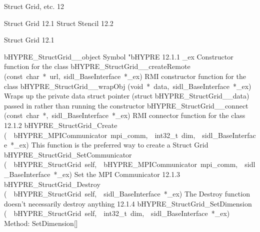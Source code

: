 \documentclass{article}
\begin{document}
\begin{cxxentry}
{}
        {Struct Grid, etc.}
        {}
        {
}
        {12}
\begin{cxxnames}
\cxxitem{}
        {Struct Grid}
        {}
        {
}
        {12.1}
\cxxitem{}
        {Struct Stencil}
        {}
        {
}
        {12.2}
\end{cxxnames}
\begin{cxxentry}
{}
        {Struct Grid}
        {}
        {
}
        {12.1}
\begin{cxxnames}
        {bHYPRE\_StructGrid\_\_object}
        {}
        {
Symbol "bHYPRE}
        {12.1.1}
        {\_ex}
        {}
        {
Constructor function for the class}
        {}
\label{cxx.12.1.9}
        {bHYPRE\_StructGrid\_\_createRemote}
        {(const\ char\ *\ url,\ sidl\_BaseInterface\ *\_ex)}
        {
RMI constructor function for the class}
        {}
\label{cxx.12.1.10}
        {bHYPRE\_StructGrid\_\_wrapObj}
        {(void\ *\ data,\ sidl\_BaseInterface\ *\_ex)}
        {
Wraps up the private data struct pointer (struct bHYPRE\_StructGrid\_\_data) passed in rather than running the constructor}
        {}
\label{cxx.12.1.11}
        {bHYPRE\_StructGrid\_\_connect}
        {(const\ char\ *,\ sidl\_BaseInterface\ *\_ex)}
        {
RMI connector function for the class}
        {12.1.2}
        {bHYPRE\_StructGrid\_Create}
        {(\ \ bHYPRE\_MPICommunicator\ mpi\_comm,\ \ int32\_t\ dim,\ \ sidl\_BaseInterface\ *\_ex)}
        {
This function is the preferred way to create a Struct Grid}
        {}
\label{cxx.12.1.12}
        {bHYPRE\_StructGrid\_SetCommunicator}
        {(\ \ bHYPRE\_StructGrid\ self,\ \ bHYPRE\_MPICommunicator\ mpi\_comm,\ \ sidl\_BaseInterface\ *\_ex)}
        {
Set the MPI Communicator}
        {12.1.3}
        {bHYPRE\_StructGrid\_Destroy}
        {(\ \ bHYPRE\_StructGrid\ self,\ \ sidl\_BaseInterface\ *\_ex)}
        {
The Destroy function doesn't necessarily destroy anything}
        {12.1.4}
        {bHYPRE\_StructGrid\_SetDimension}
        {(\ \ bHYPRE\_StructGrid\ self,\ \ int32\_t\ dim,\ \ sidl\_BaseInterface\ *\_ex)}
        {
Method:  SetDimension[]}
        {}
\label{cxx.12.1.13}

\end{cxxnames}
\end{cxxentry}
\end{cxxentry}
\end{document}
